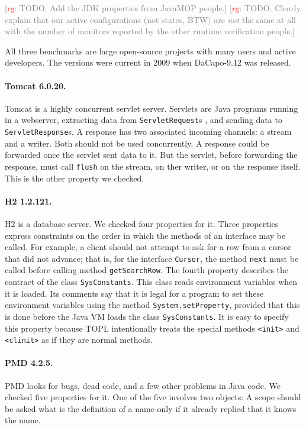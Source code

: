 \documentclass[9pt, preprint]{sigplanconf} %
\newcommand{\noterg}[2]{\textcolor{gray}{[\textcolor{red}{#1}: #2]}}
\newcommand{\rg}[1]{\noterg{rg}{#1}}
\theoremstyle{definition}
\theoremstyle{remark}
\begin{document}
\rg{TODO: Add the JDK properties from JavaMOP people.}
\rg{TODO: Clearly explain that our active configurations (not states, BTW) are \emph{not} the same at all with the number of monitors reported by the other runtime verification people.}

All three benchmarks are large open-source projects with many users and active developers.
The versions were current in 2009 when DaCapo-9.12 was released.

\paragraph{Tomcat 6.0.20.}
Tomcat is a highly concurrent servlet server. 
Servlets are Java programs running in a webserver, extracting data from {\tt ServletRequest}s , and sending data to {\tt ServletResponse}s.
A response has two associated incoming channels: a stream and a writer. Both should not be used concurrently.
A response could be forwarded once the servlet sent data to it.
But the servlet, before forwarding the response, must call {\tt flush} on the stream, on ther writer, or on the response itself.
This is the other property we checked.

\paragraph{H2 1.2.121.}
H2 is a database server.
We checked four properties for it.
Three properties express constraints on the order in which the methods of an interface may be called.
For example, a client should not attempt to ask for a row from a cursor that did not advance;
that is, for the interface {\tt Cursor}, the method {\tt next} must be called before calling method {\tt getSearchRow}.
The fourth property describes the contract of the class {\tt SysConstants}.
This class reads environment variables when it is loaded.
Its comments say that it is legal for a program to set these environment variables using the method {\tt System.setProperty}, provided that this is done before the Java VM loads the class {\tt SysConstants}.
It is easy to specify this property because TOPL intentionally treats the special methods {\tt <init>} and {\tt <clinit>} as if they are normal methods.

\paragraph{PMD 4.2.5.}
PMD looks for bugs, dead code, and a few other problems in Java code.
We checked five properties for it.
One of the five involves two objects:
A scope should be asked what is the definition of a name only if it already replied that it knows the name.
\end{document}
